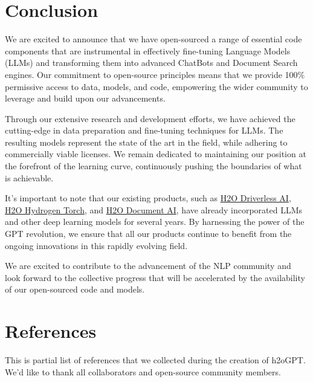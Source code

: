 \documentclass{article}
\begin{document}

\section{Conclusion}
We are excited to announce that we have open-sourced a range of essential code components that are instrumental in effectively fine-tuning Language Models (LLMs) and transforming them into advanced ChatBots and Document Search engines. Our commitment to open-source principles means that we provide 100\% permissive access to data, models, and code, empowering the wider community to leverage and build upon our advancements.

Through our extensive research and development efforts, we have achieved the cutting-edge in data preparation and fine-tuning techniques for LLMs. The resulting models represent the state of the art in the field, while adhering to commercially viable licenses. We remain dedicated to maintaining our position at the forefront of the learning curve, continuously pushing the boundaries of what is achievable.

It's important to note that our existing products, such as \href{https://h2o.ai/platform/ai-cloud/make/h2o-driverless-ai/}{H2O Driverless AI}, \href{https://h2o.ai/platform/ai-cloud/make/hydrogen-torch/}{H2O Hydrogen Torch}, and \href{https://h2o.ai/platform/ai-cloud/make/document-ai/}{H2O Document AI}, have already incorporated LLMs and other deep learning models for several years. By harnessing the power of the GPT revolution, we ensure that all our products continue to benefit from the ongoing innovations in this rapidly evolving field.

We are excited to contribute to the advancement of the NLP community and look forward to the collective progress that will be accelerated by the availability of our open-sourced code and models.

\clearpage

\section*{References}
This is partial list of references that we collected during the creation of h2oGPT. We'd like to thank all collaborators and open-source community members.
\end{document}
